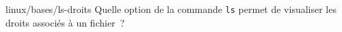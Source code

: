 \begin{question}{linux/bases/ls-droits}
  Quelle option de la commande {\tt ls} permet de visualiser les
  droits associés à un fichier~?
  \begin{reponses}
    \lastchoices
  \end{reponses}
\end{question}
